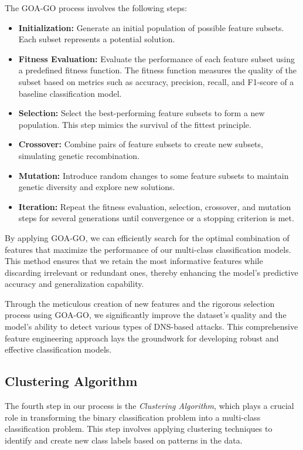 The GOA-GO process involves the following steps:
\begin{itemize}
    \item \textbf{Initialization:} Generate an initial population of possible feature subsets. Each subset represents a potential solution.
    \item \textbf{Fitness Evaluation:} Evaluate the performance of each feature subset using a predefined fitness function. The fitness function measures the quality of the subset based on metrics such as accuracy, precision, recall, and F1-score of a baseline classification model.
    \item \textbf{Selection:} Select the best-performing feature subsets to form a new population. This step mimics the survival of the fittest principle.
    \item \textbf{Crossover:} Combine pairs of feature subsets to create new subsets, simulating genetic recombination.
    \item \textbf{Mutation:} Introduce random changes to some feature subsets to maintain genetic diversity and explore new solutions.
    \item \textbf{Iteration:} Repeat the fitness evaluation, selection, crossover, and mutation steps for several generations until convergence or a stopping criterion is met.
\end{itemize}

By applying GOA-GO, we can efficiently search for the optimal combination of features that maximize the performance of our multi-class classification models. This method ensures that we retain the most informative features while discarding irrelevant or redundant ones, thereby enhancing the model's predictive accuracy and generalization capability.

Through the meticulous creation of new features and the rigorous selection process using GOA-GO, we significantly improve the dataset's quality and the model's ability to detect various types of DNS-based attacks. This comprehensive feature engineering approach lays the groundwork for developing robust and effective classification models.

\subsection{Clustering Algorithm}

The fourth step in our process is the \textit{Clustering Algorithm}, which plays a crucial role in transforming the binary classification problem into a multi-class classification problem. This step involves applying clustering techniques to identify and create new class labels based on patterns in the data.

